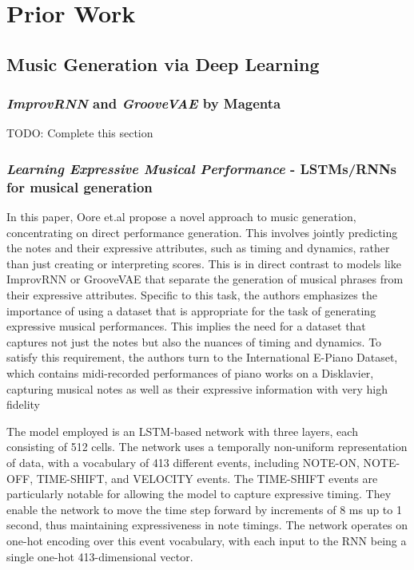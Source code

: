 \documentclass[../main.tex]{subfiles}
\begin{document}
\newpage

\chapter{Prior Work}

\section{Music Generation via Deep Learning}

\subsection{\textit{ImprovRNN} and \textit{GrooveVAE} by Magenta}

TODO: Complete this section


\subsection{\textit{Learning Expressive Musical Performance} - LSTMs/RNNs for musical generation}

In this paper, Oore et.al\cite{oore:1} propose a novel approach to music generation, concentrating on direct performance generation. This involves jointly predicting the notes and their expressive attributes, such as timing and dynamics, rather than just creating or interpreting scores. This is in direct contrast to models like ImprovRNN or GrooveVAE that separate the generation of musical phrases from their expressive attributes. Specific to this task, the authors emphasizes the importance of using a dataset that is appropriate for the task of generating expressive musical performances. This implies the need for a dataset that captures not just the notes but also the nuances of timing and dynamics. To satisfy this requirement, the authors turn to the International E-Piano Dataset, which contains midi-recorded performances of piano works on a Disklavier, capturing musical notes as well as their expressive information with very high fidelity

The model employed is an LSTM-based network with three layers, each consisting of 512 cells. The network uses a temporally non-uniform representation of data, with a vocabulary of 413 different events, including NOTE-ON, NOTE-OFF, TIME-SHIFT, and VELOCITY events. The TIME-SHIFT events are particularly notable for allowing the model to capture expressive timing. They enable the network to move the time step forward by increments of 8 ms up to 1 second, thus maintaining expressiveness in note timings.
The network operates on one-hot encoding over this event vocabulary, with each input to the RNN being a single one-hot 413-dimensional vector.
\end{document}
